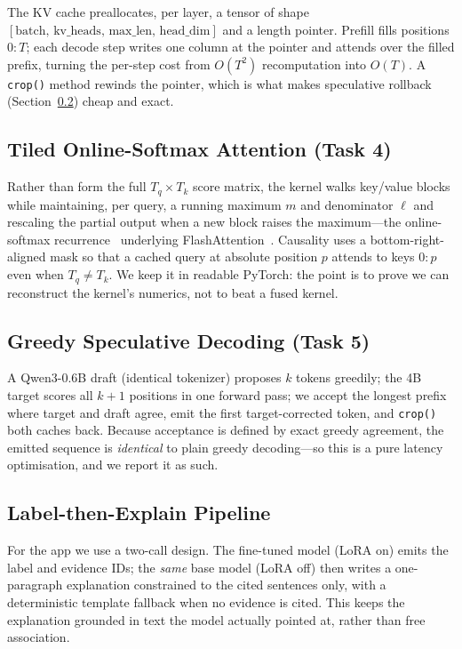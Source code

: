 \documentclass[conference]{IEEEtran}
\begin{document}
The KV cache preallocates, per layer, a tensor of shape
$[\text{batch},\,\text{kv\_heads},\,\text{max\_len},\,\text{head\_dim}]$ and a
length pointer. Prefill fills positions $0{:}T$; each decode step writes one
column at the pointer and attends over the filled prefix, turning the per-step
cost from $O(T^2)$ recomputation into $O(T)$. A \texttt{crop()} method rewinds
the pointer, which is what makes speculative rollback (Section~\ref{sec:method-spec})
cheap and exact.

\subsection{Tiled Online-Softmax Attention (Task 4)}
\label{sec:method-attn}
Rather than form the full $T_q\times T_k$ score matrix, the kernel walks key/value
blocks while maintaining, per query, a running maximum $m$ and denominator $\ell$
and rescaling the partial output when a new block raises the maximum---the
online-softmax recurrence~\cite{milakov2018online} underlying
FlashAttention~\cite{dao2022flashattention}. Causality uses a bottom-right-aligned
mask so that a cached query at absolute position $p$ attends to keys $0{:}p$ even
when $T_q\neq T_k$. We keep it in readable PyTorch: the point is to prove we can
reconstruct the kernel's numerics, not to beat a fused kernel.

\subsection{Greedy Speculative Decoding (Task 5)}
\label{sec:method-spec}
A Qwen3-0.6B draft (identical tokenizer) proposes $k$ tokens greedily; the 4B
target scores all $k{+}1$ positions in one forward pass; we accept the longest
prefix where target and draft agree, emit the first target-corrected token, and
\texttt{crop()} both caches back. Because acceptance is defined by exact greedy
agreement, the emitted sequence is \emph{identical} to plain greedy decoding---so
this is a pure latency optimisation, and we report it as such.

\subsection{Label-then-Explain Pipeline}
\label{sec:method-explain}
For the app we use a two-call design. The fine-tuned model (LoRA on) emits the
label and evidence IDs; the \emph{same} base model (LoRA off) then writes a
one-paragraph explanation constrained to the cited sentences only, with a
deterministic template fallback when no evidence is cited. This keeps the
explanation grounded in text the model actually pointed at, rather than free
association.
\end{document}
